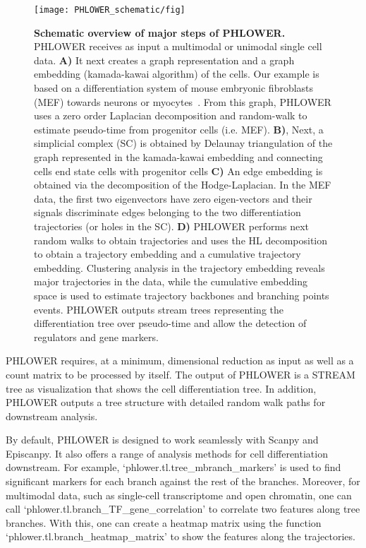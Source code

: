 \begin{figure}[!ht]
    \centering
    \texttt{[image: PHLOWER\_schematic/fig]}
    \vspace{0.1cm}
    \caption[Schematic overview of major steps of PHLOWER.]{\textbf{Schematic overview of major steps of PHLOWER.} PHLOWER receives as input a multimodal or unimodal single cell data. \textbf{A)} It next creates a graph representation and a graph embedding (kamada-kawai algorithm) of the cells. Our example is based on a differentiation system of mouse embryonic fibroblasts (MEF) towards neurons or myocytes~\citep{treutlein2016dissecting}. From this graph, PHLOWER uses a zero order Laplacian decomposition and random-walk to estimate pseudo-time from progenitor cells (i.e. MEF). \textbf{B)}, Next, a simplicial complex (SC) is obtained by Delaunay triangulation of the graph represented in the kamada-kawai embedding and connecting cells end state cells with progenitor cells \textbf{C)} An edge embedding is obtained via the decomposition of the Hodge-Laplacian. In the MEF data, the first two eigenvectors have zero eigen-vectors and their signals discriminate edges belonging to the two differentiation trajectories (or holes in the SC). \textbf{D)} PHLOWER performs next random walks to obtain trajectories and uses the HL decomposition to obtain a trajectory embedding and a cumulative trajectory embedding. Clustering analysis in the trajectory embedding reveals major trajectories in the data, while the cumulative embedding space is used to estimate trajectory backbones and branching points events. PHLOWER outputs stream trees representing the differentiation tree over pseudo-time and allow the detection of regulators and gene markers.}
    \label{fig:PHLOWER_schematic}
\end{figure}

PHLOWER requires, at a minimum, dimensional reduction as input as well as a count matrix to be processed by itself. The output of PHLOWER is a STREAM tree as visualization that shows the cell differentiation tree. In addition, PHLOWER outputs a tree structure with detailed random walk paths for downstream analysis.

By default, PHLOWER is designed to work seamlessly with Scanpy and Episcanpy. It also offers a range of analysis methods for cell differentiation downstream. For example, `phlower.tl.tree\_mbranch\_markers' is used to find significant markers for each branch against the rest of the branches. Moreover, for multimodal data, such as single-cell transcriptome and open chromatin, one can call `phlower.tl.branch\_TF\_gene\_correlation' to correlate two features along tree branches. With this, one can create a heatmap matrix using the function `phlower.tl.branch\_heatmap\_matrix' to show the features along the trajectories.


